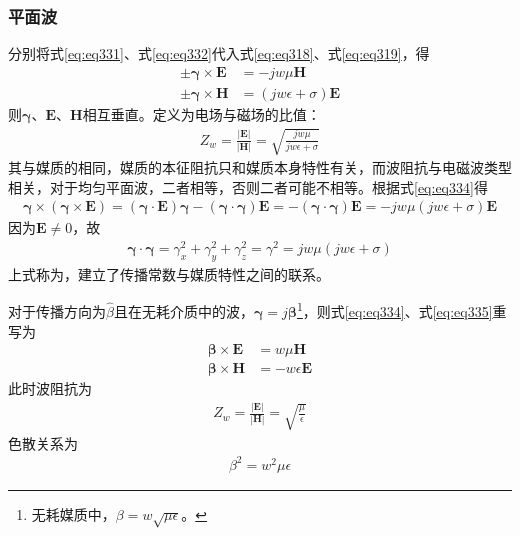 \documentclass{article}
\numberwithin{equation}{section}
\renewcommand{\vec}[1]{\boldsymbol{#1}}
\begin{document}
\subsubsection{平面波}
分别将式\ref{eq:eq331}、式\ref{eq:eq332}代入式\ref{eq:eq318}、式\ref{eq:eq319}，得
\begin{align}
    \label{eq:eq334}
    \pm\vec{\gamma} \times \mathbf{E}&=-jw\mu\mathbf{H} \\
    \label{eq:eq335}
    \pm\vec{\gamma} \times \mathbf{H}&=(jw\epsilon+\sigma)\mathbf{E}
\end{align}
则$\vec{\gamma}$、$\mathbf{E}$、$\mathbf{H}$相互垂直。定义\textbf{\color{blue}{波阻抗}}为电场与磁场的比值：
\begin{align}
    \label{eq:eq336}
    Z_w=\frac{|\mathbf{E}|}{|\mathbf{H}|}=\sqrt{\frac{jw\mu}{jw\epsilon+\sigma}}
\end{align}
其与媒质的\textbf{\color{blue}{本征阻抗$\eta$}}相同，媒质的本征阻抗只和媒质本身特性有关，而波阻抗与电磁波类型相关，对于均匀平面波，二者相等，否则二者可能不相等。根据式\ref{eq:eq334}得
\begin{align}
    \label{eq:eq337}
    \vec{\gamma}\times(\vec{\gamma}\times\mathbf{E})=(\vec{\gamma}\cdot\mathbf{E})\vec{\gamma}-(\vec{\gamma}\cdot\vec{\gamma})\mathbf{E}=-(\vec{\gamma}\cdot\vec{\gamma})\mathbf{E}=-jw\mu(jw\epsilon+\sigma)\mathbf{E}
\end{align}
因为$\mathbf{E}\neq 0$，故
\begin{align}
    \label{eq:eq338}
    \vec{\gamma}\cdot\vec{\gamma}=\gamma_x^2+\gamma_y^2+\gamma_z^2=\gamma^2=jw\mu(jw\epsilon+\sigma)
\end{align}
上式称为\textbf{\color{blue}{色散关系}}，建立了传播常数与媒质特性之间的联系。
\par
对于传播方向为$\hat{\beta}$且在无耗介质中的波，$\vec{\gamma}=j\vec{\beta}$\footnote{无耗媒质中，$\beta=w\sqrt{\mu\epsilon}$。}，则式\ref{eq:eq334}、式\ref{eq:eq335}重写为
\begin{align}
    \label{eq:eq339}
    \vec{\beta} \times \mathbf{E}&=w\mu\mathbf{H} \\
    \label{eq:eq340}
    \vec{\beta} \times \mathbf{H}&=-w\epsilon\mathbf{E}
\end{align}
此时波阻抗为
\begin{align}
    \label{eq:eq341}
    Z_w=\frac{|\mathbf{E}|}{|\mathbf{H}|}=\sqrt{\frac{\mu}{\epsilon}}
\end{align}
色散关系为
\begin{align}
    \label{eq:eq342}
    \beta^2=w^2\mu\epsilon
\end{align}
\end{document}
